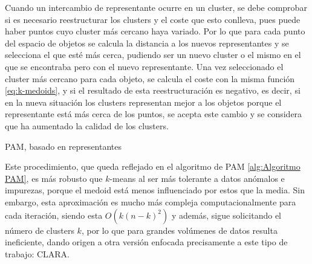 \documentclass[10pt, a4paper]{article}
\begin{document}
Cuando un intercambio de representante ocurre en un cluster, se debe comprobar si es necesario reestructurar los clusters y el coste que esto conlleva, pues puede haber puntos cuyo cluster más cercano haya variado. Por lo que para cada punto del espacio de objetos se calcula la distancia a los nuevos representantes y se selecciona el que esté más cerca, pudiendo ser un nuevo cluster o el mismo en el que se encontraba pero con el nuevo representante. Una vez seleccionado el cluster más cercano para cada objeto, se calcula el coste con la misma función \ref{eq:k-medoids}, y si el resultado de esta reestructuración es negativo, es decir, si en la nueva situación los clusters representan mejor a los objetos porque el representante está más cerca de los puntos, se acepta este cambio y se considera que ha aumentado la calidad de los clusters.

\begin{algorithm}[ht]
\SetAlgoLined
  \LinesNumbered
  \DontPrintSemicolon
  \caption{PAM, basado en representantes}
  \label{alg:Algoritmo PAM}
\end{algorithm}

Este procedimiento, que queda reflejado en el algoritmo de PAM \ref{alg:Algoritmo PAM}, es más robusto que $k$-means al ser más tolerante a datos anómalos e impurezas, porque el medoid está menos influenciado por estos que la media. Sin embargo, esta aproximación es mucho más compleja computacionalmente para cada iteración, siendo esta $O \left(k\left(n-k\right)^2\right)$ y además, sigue solicitando el número de clusters $k$, por lo que para grandes volúmenes de datos resulta ineficiente, dando origen a otra versión enfocada precisamente a este tipo de trabajo: CLARA.
\end{document}
